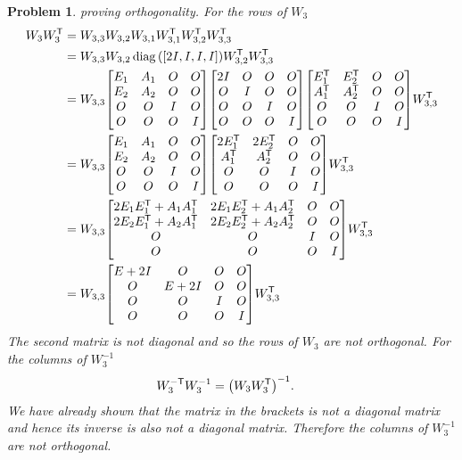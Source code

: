 \documentclass{article}
\newcommand{\T}{\mathsf{T}}
\DeclareMathOperator{\diag}{diag}
\theoremstyle{pprop}
\newtheorem{problem}{Problem}[section]
\begin{document}
\begin{problem}
proving orthogonality.
For the rows of $W_3$
\begin{align*}
   W_3 W_3^{\sf T} & = W_{3,3}W_{3,2}W_{3,1}W_{3,1}^{\sf T}W_{3,2}^{\sf T}W_{3,3}^{\sf T} \\
   & = W_{3,3}W_{3,2}\diag\qty(\qty[2I,I,I,I])W_{3,2}^{\sf T}W_{3,3}^{\sf T} \\
   & = W_{3,3} \mqty[ E_1 & A_1 & O & O \\ E_2 & A_2 & O & O \\ O & O & I & O \\ O & O & O & I \\]
   \mqty[ 2I & O & O & O \\ O & I & O & O \\ O & O & I & O \\ O & O & O & I \\]
   \mqty[E_1^{\sf T} & E_2^{\sf T} & O & O \\A_1^{\sf T} & A_2^{\sf T} & O & O \\O & O & I & O \\O & O & O & I ] 
   W_{3,3}^{\sf T} \\
   & = W_{3,3} \mqty[ E_1 & A_1 & O & O \\ E_2 & A_2 & O & O \\ O & O & I & O \\ O & O & O & I \\]
   \mqty[2E_1^{\sf T} & 2E_2^{\sf T} & O & O \\A_1^{\sf T} & A_2^{\sf T} & O & O \\O & O & I & O \\O & O & O & I ] W_{3,3}^{\sf T}  \\
   & =  W_{3,3} \mqty[ 2E_1E_1^{\sf T}+A_1A_1^{\sf T} & 2E_1E_2^{\sf T}+A_1A_2^{\sf T} & O & O \\ 
   2E_2E_1^{\sf T}+A_2A_1^{\sf T} & 2E_2E_2^{\sf T}+A_2A_2^{\sf T} & O & O \\ O & O & I & O \\ O & O & O & I \\] W_{3,3}^{\sf T} \\
   & =  W_{3,3} \mqty[ E+2I & O & O & O \\ 
   O & E+2I & O & O \\ O & O & I & O \\ O & O & O & I \\] W_{3,3}^{\sf T}  
\end{align*}
The second matrix is not diagonal and so the rows of $W_3$ are not orthogonal. For the columns of $W_3^{-1}$
\begin{align*}
  W_3^{-\T} W_3^{-1} & = \qty(W_3 W_3^\T)^{-1}. 
\end{align*}
We have already shown that the matrix in the brackets is not a diagonal matrix and hence its inverse is also not a diagonal matrix.
Therefore the columns of $W_3^{-1}$ are not orthogonal.


\end{problem}
\end{document}
